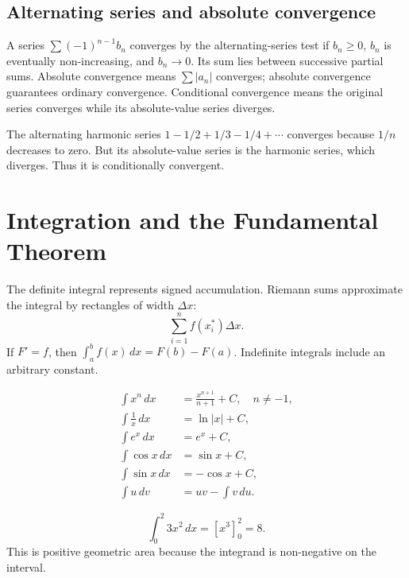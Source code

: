 \documentclass[12pt,a4paper]{article}
\begin{document}
\subsection{Alternating series and absolute convergence}
A series $\sum(-1)^{n-1}b_n$ converges by the alternating-series test if $b_n\geq0$, $b_n$ is eventually non-increasing, and $b_n\to0$. Its sum lies between successive partial sums. Absolute convergence means $\sum|a_n|$ converges; absolute convergence guarantees ordinary convergence. Conditional convergence means the original series converges while its absolute-value series diverges.

\begin{exampleBox}The alternating harmonic series $1-1/2+1/3-1/4+\cdots$ converges because $1/n$ decreases to zero. But its absolute-value series is the harmonic series, which diverges. Thus it is conditionally convergent.
\end{exampleBox}

\section{Integration and the Fundamental Theorem}
The definite integral represents signed accumulation. Riemann sums approximate the integral by rectangles of width $\Delta x$:
\[
\sum_{i=1}^{n}f(x_i^*)\Delta x.
\]
If $F'=f$, then $\int_a^b f(x)\,dx=F(b)-F(a)$. Indefinite integrals include an arbitrary constant.
\begin{formulaBox}
\begin{align*}
\int x^n\,dx&=\frac{x^{n+1}}{n+1}+C,\quad n\ne-1,\\
\int \frac{1}{x}\,dx&=\ln|x|+C,\\
\int e^x\,dx&=e^x+C,\\
\int \cos x\,dx&=\sin x+C,\\
\int \sin x\,dx&=-\cos x+C,\\
\int u\,dv&=uv-\int v\,du.
\end{align*}
\end{formulaBox}
\begin{exampleBox}
\[\int_0^2 3x^2\,dx=[x^3]_0^2=8.\]
This is positive geometric area because the integrand is non-negative on the interval.
\end{exampleBox}
\begin{center}\end{center}
\end{document}
